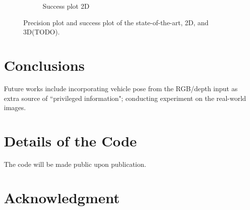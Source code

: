 \documentclass[10pt,twocolumn,letterpaper]{article}
\begin{document}
\begin{figure}[t]
\begin{subfigure}[c]{0.4\textwidth}
        \caption{\small{Success plot 2D}}
    \end{subfigure}
\caption{Precision plot and success plot of the state-of-the-art, 2D, and 3D(TODO).
}
\label{fig:precision_plot_and_success_plot_OBT100}
\end{figure}

\section{Conclusions}

Future works include incorporating vehicle pose from the RGB/depth input as extra source of ``privileged information"; conducting experiment on the real-world images.

\section*{Details of the Code}
 The code will be made public upon publication.

\section*{Acknowledgment}

{\small


}
\end{document}
